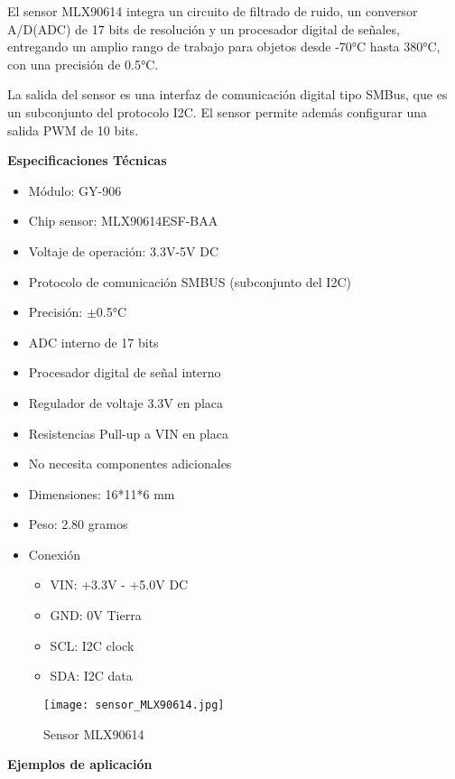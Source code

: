 El sensor MLX90614 integra un circuito de filtrado de ruido, un conversor A/D(ADC) de 17 bits de resolución y un procesador digital de señales, entregando un amplio rango de trabajo para objetos desde -70°C hasta 380°C, con una precisión de 0.5°C.

La salida del sensor es una interfaz de comunicación digital tipo SMBus, que es un subconjunto del protocolo I2C. El sensor permite además configurar una salida PWM de 10 bits.

\textbf{Especificaciones Técnicas}
\begin{itemize}
    \item Módulo: GY-906
    \item Chip sensor: MLX90614ESF-BAA
    \item Voltaje de operación: 3.3V-5V DC
    \item Protocolo de comunicación SMBUS (subconjunto del I2C)
    \item Precisión: $ \pm $0.5°C
    \item ADC interno de 17 bits
    \item Procesador digital de señal interno
    \item Regulador de voltaje 3.3V en placa
    \item Resistencias Pull-up a VIN en placa
    \item No necesita componentes adicionales
    \item Dimensiones: 16*11*6 mm
    \item Peso: 2.80 gramos
    \item Conexión
          \begin{itemize}
              \item VIN: +3.3V - +5.0V DC
              \item GND: 0V Tierra
              \item SCL: I2C clock
              \item SDA: I2C data
          \end{itemize}
\end{itemize}
\begin{figure}[htp!]
    \centering
    \texttt{[image: sensor\_MLX90614.jpg]}
    \caption{Sensor MLX90614}
    \label{fig: sensor}
\end{figure}\FloatBarrier
\textbf{Ejemplos de aplicación}
